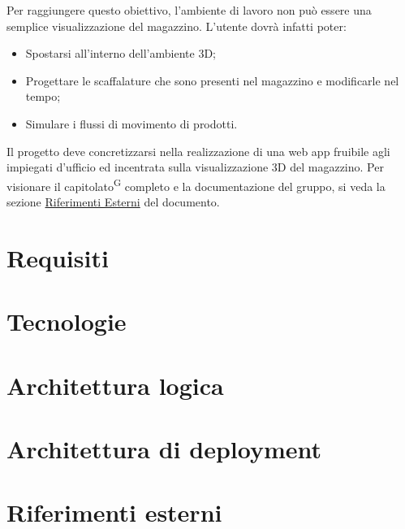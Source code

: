     Per raggiungere questo obiettivo, l'ambiente di lavoro non può essere una semplice visualizzazione del magazzino. L'utente dovrà infatti poter:
    \begin{itemize}
        \item Spostarsi all'interno dell'ambiente 3D;
        \item Progettare le scaffalature che sono presenti nel magazzino e modificarle nel tempo;
        \item Simulare i flussi di movimento di prodotti.
    \end{itemize}
    
    Il progetto deve concretizzarsi nella realizzazione di una web app fruibile agli impiegati d'ufficio ed incentrata sulla visualizzazione 3D del magazzino.
    Per visionare il capitolato\textsuperscript{G} completo e la documentazione del gruppo, si veda la sezione \hyperref[sec:ref_esterni]{Riferimenti Esterni} 
    del documento.

\section{Requisiti}\label{sec:requisiti}

\section{Tecnologie}\label{sec:tecnologie}

\section{Architettura logica}\label{sec:architettura_logica}

\section{Architettura di deployment}\label{sec:architettura_deployment}

\section{Riferimenti esterni}\label{sec:ref_esterni}

